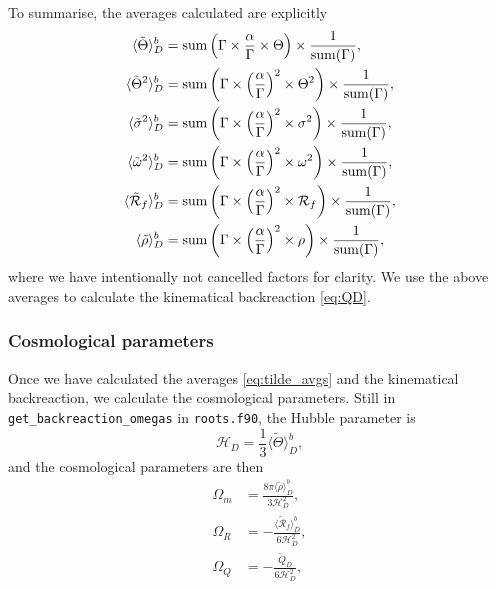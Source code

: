 \documentclass[a4paper]{article}
\newcommand{\alp}{\alpha}
\newcommand{\Gam}{\Gamma}
\begin{document}
To summarise, the averages calculated are explicitly
\begin{align}\label{eq:tilde_avgs}
	\langle\tilde{\Theta}\rangle_D^b &= {\rm sum}\left(\Gam \times \frac{\alp}{\Gam} \times \Theta \right) \times \frac{1}{{\rm sum}(\Gam)}, \\
	\langle\tilde{\Theta}^2\rangle_D^b &= {\rm sum}\left(\Gam \times \left(\frac{\alp}{\Gam}\right)^2 \times \Theta^2 \right) \times \frac{1}{{\rm sum}(\Gam)}, \\
	\langle\tilde{\sigma}^2\rangle_D^b &= {\rm sum}\left(\Gam \times \left(\frac{\alp}{\Gam}\right)^2 \times \sigma^2 \right) \times \frac{1}{{\rm sum}(\Gam)}, \\ 
	\langle\tilde{\omega}^2\rangle_D^b &= {\rm sum}\left(\Gam \times \left(\frac{\alp}{\Gam}\right)^2 \times \omega^2 \right) \times \frac{1}{{\rm sum}(\Gam)}, \\
	\langle\tilde{\mathcal{R}}_f\rangle_D^b &= {\rm sum}\left(\Gam \times \left(\frac{\alp}{\Gam}\right)^2 \times \mathcal{R}_f \right) \times \frac{1}{{\rm sum}(\Gam)}, \\
	\langle\tilde{\rho}\rangle_D^b &= {\rm sum}\left(\Gam \times \left(\frac{\alp}{\Gam}\right)^2 \times \rho \right) \times \frac{1}{{\rm sum}(\Gam)}, \\
\end{align}
where we have intentionally not cancelled factors for clarity. We use the above averages to calculate the kinematical backreaction \eqref{eq:QD}.


\subsubsection{Cosmological parameters}

Once we have calculated the averages \eqref{eq:tilde_avgs} and the kinematical backreaction, we calculate the cosmological parameters. Still in \texttt{get\_backreaction\_omegas} in \texttt{roots.f90}, the Hubble parameter is
\begin{equation}
	\mathcal{H}_D = \frac{1}{3} \langle\tilde{\Theta}\rangle_D^b, 
\end{equation}
and the cosmological parameters are then
\begin{align}
	\Omega_m &= \frac{8 \pi \langle\tilde{\rho}\rangle_D^b}{3 \mathcal{H}_D^2}, \\
	\Omega_R &= - \frac{\langle\tilde{\mathcal{R}}_f\rangle_D^b}{6 \mathcal{H}_D^2}, \\
	\Omega_Q &= - \frac{\tilde{Q}_D}{6 \mathcal{H}_D^2},
\end{align}
\end{document}
